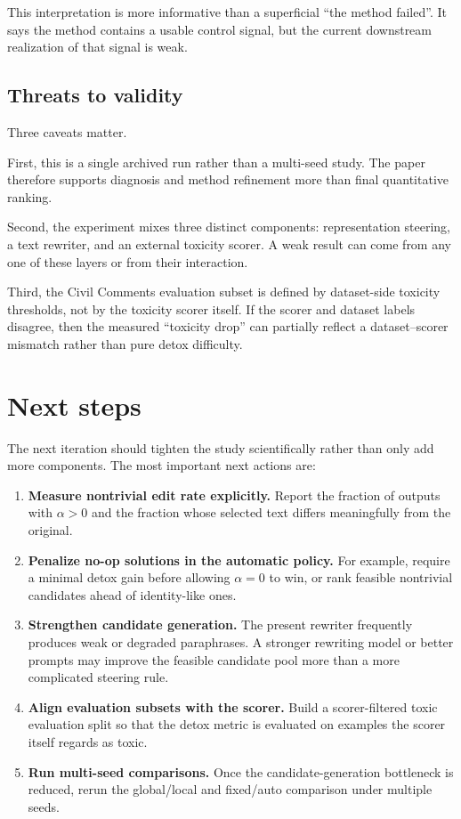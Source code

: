 \documentclass[10pt,twocolumn]{article}
\begin{document}
This interpretation is more informative than a superficial \enquote{the method failed}. It says the method contains a usable control signal, but the current downstream realization of that signal is weak.

\subsection{Threats to validity}
Three caveats matter.

First, this is a single archived run rather than a multi-seed study. The paper therefore supports diagnosis and method refinement more than final quantitative ranking.

Second, the experiment mixes three distinct components: representation steering, a text rewriter, and an external toxicity scorer. A weak result can come from any one of these layers or from their interaction.

Third, the Civil Comments evaluation subset is defined by dataset-side toxicity thresholds, not by the toxicity scorer itself. If the scorer and dataset labels disagree, then the measured \enquote{toxicity drop} can partially reflect a dataset--scorer mismatch rather than pure detox difficulty.

\section{Next steps}
The next iteration should tighten the study scientifically rather than only add more components. The most important next actions are:
\begin{enumerate}[leftmargin=1.2em,itemsep=0.12em]
\item \textbf{Measure nontrivial edit rate explicitly.} Report the fraction of outputs with $\alpha>0$ and the fraction whose selected text differs meaningfully from the original.
\item \textbf{Penalize no-op solutions in the automatic policy.} For example, require a minimal detox gain before allowing $\alpha=0$ to win, or rank feasible nontrivial candidates ahead of identity-like ones.
\item \textbf{Strengthen candidate generation.} The present rewriter frequently produces weak or degraded paraphrases. A stronger rewriting model or better prompts may improve the feasible candidate pool more than a more complicated steering rule.
\item \textbf{Align evaluation subsets with the scorer.} Build a scorer-filtered toxic evaluation split so that the detox metric is evaluated on examples the scorer itself regards as toxic.
\item \textbf{Run multi-seed comparisons.} Once the candidate-generation bottleneck is reduced, rerun the global/local and fixed/auto comparison under multiple seeds.
\end{enumerate}
\end{document}

